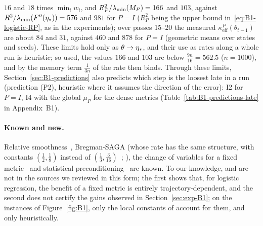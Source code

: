 $16$ and $18$ times $\min_iw_i$, and $R_P^2/\lambda_{\min}(M_P)=166$ and $103$, against $R^2/\lambda_{\min}(F''(\eta_\ast))=576$ and $981$
for $P=I$ ($R_P^2$ being the upper bound in~\eqref{eq:B1-logistic-RP}, as in the experiments); over passes 15--20 the
measured $\kappa^P_{\mathrm{eff}}(\theta_{t-1})$ are about $84$ and $31$, against $460$ and $878$ for $P=I$ (geometric
means over states and seeds). These limits hold only as $\theta\to\eta_\ast$, and their use as rates along a whole run
is heuristic; so used, the values $166$ and $103$ are below $\frac{9n}{16}=562.5$ ($n=1000$), and by
 the memory term $\frac1{3n}$ of the rate then binds. Through these limits,
Section~\ref{sec:B1-predictions} also predicts which step is the loosest late in a run (prediction (P2), heuristic
where it assumes the direction of the error): I2 for $P=I$, I4 with the global $\mu_P$ for the dense metrics
(Table~\ref{tab:B1-predictions-late} in Appendix~B1).

\paragraph{Known and new.}
Relative smoothness~\cite{lu2018relatively,bauschke2017descent}, Bregman-SAGA (whose rate has the same structure, with
constants $(\frac12,\frac18)$ instead of $(\frac13,\frac3{16})$~\cite[Corollary~1]{dragomir2021fast};
), the change of variables for a fixed metric~\cite{kolte2015accelerating,gonen2016solving}
and statistical preconditioning~\cite{hendrikx2020statistically} are known. To our knowledge,
 and  are not in the sources we reviewed in this form; the first
shows that, for logistic regression, the benefit of a fixed metric is entirely trajectory-dependent, and the second
does not certify the gains observed in Section~\ref{sec:exp-B1}; on the instances of Figure~\ref{fig:B1}, only the local
constants of  account for them, and only heuristically.
